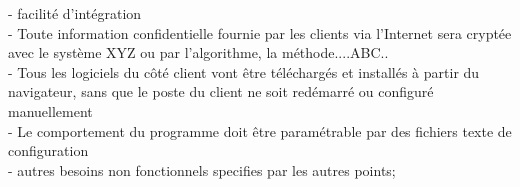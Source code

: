 - facilité d'intégration\\
- Toute information confidentielle fournie par les  clients via l’Internet sera cryptée avec le système XYZ  ou par l’algorithme, la méthode....ABC..  \\
- Tous les logiciels du côté client vont être  téléchargés et installés à partir du navigateur, sans que  le poste du client ne soit redémarré ou configuré manuellement \\
- Le comportement du programme doit être paramétrable par des fichiers texte de configuration \\
- autres besoins non fonctionnels specifies par les autres points;



